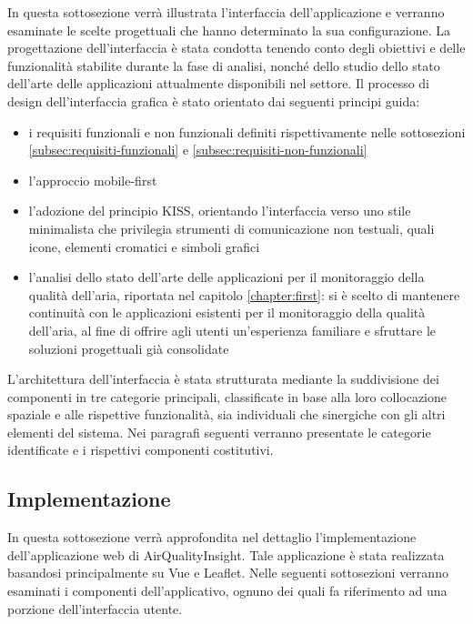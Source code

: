 In questa sottosezione verrà illustrata l'interfaccia dell'applicazione e verranno esaminate le scelte progettuali
che hanno determinato la sua configurazione.
La progettazione dell'interfaccia è stata condotta tenendo conto degli obiettivi e delle funzionalità stabilite
durante la fase di analisi, nonché dello studio dello stato dell'arte delle applicazioni attualmente
disponibili nel settore.
Il processo di design dell'interfaccia grafica è stato orientato dai seguenti principi guida:
\begin{itemize}
  \item i requisiti funzionali e non funzionali definiti rispettivamente nelle sottosezioni
        \ref{subsec:requisiti-funzionali} e \ref{subsec:requisiti-non-funzionali}
  \item l'approccio mobile-first
  \item l'adozione del principio KISS, orientando l'interfaccia verso uno stile minimalista che privilegia strumenti
        di comunicazione non testuali, quali icone, elementi cromatici e simboli grafici
  \item l'analisi dello stato dell'arte delle applicazioni per il monitoraggio della qualità dell'aria,
        riportata nel capitolo \ref{chapter:first}: si è scelto di mantenere continuità
        con le applicazioni esistenti per il monitoraggio della qualità dell'aria, al fine di offrire agli utenti
        un'esperienza familiare e sfruttare le soluzioni progettuali già consolidate
\end{itemize}
L'architettura dell'interfaccia è stata strutturata mediante la suddivisione dei componenti
in tre categorie principali, classificate in base alla loro collocazione spaziale e alle rispettive funzionalità,
sia individuali che sinergiche con gli altri elementi del sistema.
Nei paragrafi seguenti verranno presentate le categorie identificate e i rispettivi componenti costitutivi.

\subsection{Implementazione}

In questa sottosezione verrà approfondita nel dettaglio l'implementazione dell'applicazione web di AirQualityInsight.
Tale applicazione è stata realizzata basandosi principalmente su Vue e Leaflet.
Nelle seguenti sottosezioni verranno esaminati i componenti dell'applicativo, ognuno dei quali fa riferimento
ad una porzione dell'interfaccia utente.

